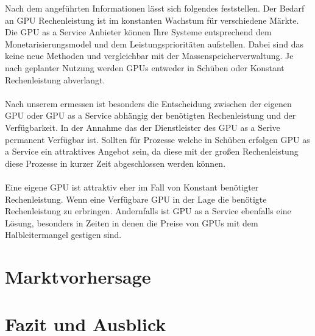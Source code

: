 \documentclass[12pt,toc=bib,toc=listof]{scrreprt}
\newcounter{savepage}
\begin{document}
Nach dem angeführten Informationen lässt sich folgendes feststellen. 
Der Bedarf an GPU Rechenleistung ist im konstanten Wachstum für verschiedene Märkte. Die GPU as a Service Anbieter 
können Ihre Systeme entsprechend dem Monetarisierungsmodel und dem Leistungsprioritäten aufstellen. Dabei sind das 
keine neue Methoden und vergleichbar mit der Massenspeicherverwaltung. Je nach geplanter Nutzung werden GPUs 
entweder in Schüben oder Konstant Rechenleistung abverlangt.\\ \\
Nach unserem ermessen ist besonders die Entscheidung zwischen der eigenen GPU oder GPU as a Service abhängig der 
benötigten Rechenleistung und der Verfügbarkeit. In der Annahme das der Dienstleister des GPU as a Serive permanent 
Verfügbar ist. Sollten für Prozesse welche in Schüben erfolgen GPU as a Service ein attraktives Angebot sein, da 
diese mit der großen Rechenleistung diese Prozesse in kurzer Zeit abgeschlossen werden können.\\ \\
Eine eigene GPU ist attraktiv eher im Fall von Konstant benötigter Rechenleistung. Wenn eine Verfügbare GPU in der Lage 
die benötigte Rechenleistung zu erbringen. Andernfalls ist GPU as a Service ebenfalls eine Lösung, besonders in Zeiten 
in denen die Preise von GPUs mit dem Halbleitermangel gestigen sind.

\chapter{Marktvorhersage}
\label{sec:Marktvorhersage}


\chapter{Fazit und Ausblick} %
\label{sec:fazit}



\appendix
\newpage

\setcounter{page}{\thesavepage}


\end{document}
